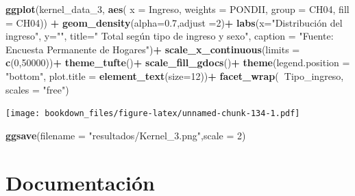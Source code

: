\documentclass[]{book}
\newenvironment{Shaded}{\begin{snugshade}}{\end{snugshade}}
\newcommand{\DataTypeTok}[1]{\textcolor[rgb]{0.13,0.29,0.53}{#1}}
\newcommand{\DecValTok}[1]{\textcolor[rgb]{0.00,0.00,0.81}{#1}}
\newcommand{\FloatTok}[1]{\textcolor[rgb]{0.00,0.00,0.81}{#1}}
\newcommand{\KeywordTok}[1]{\textcolor[rgb]{0.13,0.29,0.53}{\textbf{#1}}}
\newcommand{\NormalTok}[1]{#1}
\newcommand{\OperatorTok}[1]{\textcolor[rgb]{0.81,0.36,0.00}{\textbf{#1}}}
\newcommand{\StringTok}[1]{\textcolor[rgb]{0.31,0.60,0.02}{#1}}
\begin{document}
\begin{Shaded}
\begin{Highlighting}[]
\KeywordTok{ggplot}\NormalTok{(kernel_data_}\DecValTok{3}\NormalTok{, }\KeywordTok{aes}\NormalTok{(}
  \DataTypeTok{x =}\NormalTok{ Ingreso,}
  \DataTypeTok{weights =}\NormalTok{ PONDII,}
  \DataTypeTok{group =}\NormalTok{ CH04,}
  \DataTypeTok{fill =}\NormalTok{ CH04)) }\OperatorTok{+}
\StringTok{  }\KeywordTok{geom_density}\NormalTok{(}\DataTypeTok{alpha=}\FloatTok{0.7}\NormalTok{,}\DataTypeTok{adjust =}\DecValTok{2}\NormalTok{)}\OperatorTok{+}
\StringTok{  }\KeywordTok{labs}\NormalTok{(}\DataTypeTok{x=}\StringTok{"Distribución del ingreso"}\NormalTok{, }\DataTypeTok{y=}\StringTok{""}\NormalTok{,}
       \DataTypeTok{title=}\StringTok{" Total según tipo de ingreso y sexo"}\NormalTok{, }
       \DataTypeTok{caption =} \StringTok{"Fuente: Encuesta Permanente de Hogares"}\NormalTok{)}\OperatorTok{+}
\StringTok{  }\KeywordTok{scale_x_continuous}\NormalTok{(}\DataTypeTok{limits =} \KeywordTok{c}\NormalTok{(}\DecValTok{0}\NormalTok{,}\DecValTok{50000}\NormalTok{))}\OperatorTok{+}
\StringTok{  }\KeywordTok{theme_tufte}\NormalTok{()}\OperatorTok{+}
\StringTok{  }\KeywordTok{scale_fill_gdocs}\NormalTok{()}\OperatorTok{+}
\StringTok{  }\KeywordTok{theme}\NormalTok{(}\DataTypeTok{legend.position =} \StringTok{"bottom"}\NormalTok{,}
        \DataTypeTok{plot.title      =} \KeywordTok{element_text}\NormalTok{(}\DataTypeTok{size=}\DecValTok{12}\NormalTok{))}\OperatorTok{+}
\StringTok{  }\KeywordTok{facet_wrap}\NormalTok{(}\OperatorTok{~}\NormalTok{Tipo_ingreso, }\DataTypeTok{scales =} \StringTok{"free"}\NormalTok{)}
\end{Highlighting}
\end{Shaded}

\texttt{[image: bookdown\_files/figure-latex/unnamed-chunk-134-1.pdf]}

\begin{Shaded}
\begin{Highlighting}[]
\KeywordTok{ggsave}\NormalTok{(}\DataTypeTok{filename =} \StringTok{"resultados/Kernel_3.png"}\NormalTok{,}\DataTypeTok{scale =} \DecValTok{2}\NormalTok{)}
\end{Highlighting}
\end{Shaded}

\hypertarget{documentacion}{%
\chapter{Documentación}\label{documentacion}}
\end{document}
